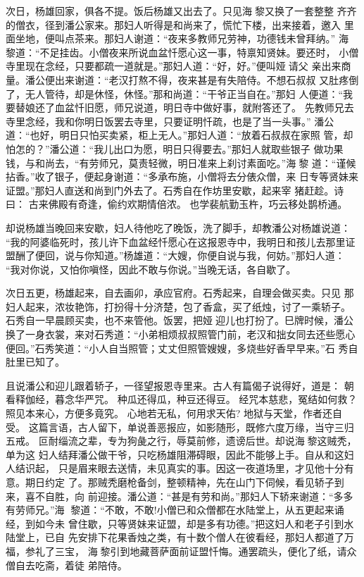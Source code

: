 次日，杨雄回家，俱各不提。饭后杨雄又出去了。只见海黎又换了一套整整
齐齐的僧衣，径到潘公家来。那妇人听得是和尚来了，慌忙下楼，出来接着，邀入
里面坐地，便叫点茶来。那妇人谢道：“夜来多教师兄劳神，功德钱未曾拜纳。”
海黎道：“不足挂齿。小僧夜来所说血盆忏愿心这一事，特禀知贤妹。要还时，
小僧寺里现在念经，只要都疏一道就是。”那妇人道：“好，好。”便叫娅请父
亲出来商量。潘公便出来谢道：“老汉打熬不得，夜来甚是有失陪侍。不想石叔叔
又肚疼倒了，无人管待，却是休怪，休怪。”那和尚道：“干爷正当自在。”那妇
人便道：“我要替娘还了血盆忏旧愿，师兄说道，明日寺中做好事，就附答还了。
先教师兄去寺里念经，我和你明日饭罢去寺里，只要证明忏疏，也是了当一头事。”
潘公道：“也好，明日只怕买卖紧，柜上无人。”那妇人道：“放着石叔叔在家照
管，却怕怎的？”潘公道：“我儿出口为愿，明日只得要去。”那妇人就取些银子
做功果钱，与和尚去，“有劳师兄，莫责轻微，明日准来上刹讨素面吃。”海黎
道：“谨候拈香。”收了银子，便起身谢道：“多承布施，小僧将去分俵众僧，来
日专等贤妹来证盟。”那妇人直送和尚到门外去了。石秀自在作坊里安歇，起来宰
猪赶趁。诗曰：
古来佛殿有奇逢，偷约欢期情倍浓。
也学裴航勤玉杵，巧云移处鹊桥通。

却说杨雄当晚回来安歇，妇人待他吃了晚饭，洗了脚手，却教潘公对杨雄说道：
“我的阿婆临死时，孩儿许下血盆经忏愿心在这报恩寺中，我明日和孩儿去那里证
盟酬了便回，说与你知道。”杨雄道：“大嫂，你便自说与我，何妨。”那妇人道：
“我对你说，又怕你嗔怪，因此不敢与你说。”当晚无话，各自歇了。

次日五更，杨雄起来，自去画卯，承应官府。石秀起来，自理会做买卖。只见
那妇人起来，浓妆艳饰，打扮得十分济楚，包了香盒，买了纸烛，讨了一乘轿子。
石秀自一早晨顾买卖，也不来管他。饭罢，把娅迎儿也打扮了。巳牌时候，潘公
换了一身衣裳，来对石秀道：“小弟相烦叔叔照管门前，老汉和拙女同去还些愿心
便回。”石秀笑道：“小人自当照管；丈丈但照管嫂嫂，多烧些好香早早来。”石
秀自肚里已知了。

且说潘公和迎儿跟着轿子，一径望报恩寺里来。古人有篇偈子说得好，道是：
朝看释伽经，暮念华严咒。
种瓜还得瓜，种豆还得豆。
经咒本慈悲，冤结如何救？
照见本来心，方便多竟究。
心地若无私，何用求天佑?
地狱与天堂，作者还自受。
这篇言语，古人留下，单说善恶报应，如影随形，既修六度万缘，当守三归五戒。
叵耐缁流之辈，专为狗彘之行，辱莫前修，遗谤后世。却说海黎这贼秃，单为这
妇人结拜潘公做干爷，只吃杨雄阻滞碍眼，因此不能够上手。自从和这妇人结识起，
只是眉来眼去送情，未见真实的事。因这一夜道场里，才见他十分有意。期日约定
了。那贼秃磨枪备剑，整顿精神，先在山门下伺候，看见轿子到来，喜不自胜，向
前迎接。潘公道：“甚是有劳和尚。”那妇人下轿来谢道：“多多有劳师兄。”海
黎道：“不敢，不敢!小僧已和众僧都在水陆堂上，从五更起来诵经，到如今未
曾住歇，只等贤妹来证盟，却是多有功德。”把这妇人和老子引到水陆堂上，已自
先安排下花果香烛之类，有十数个僧人在彼看经，那妇人都道了万福，参礼了三宝，
海黎引到地藏菩萨面前证盟忏悔。通罢疏头，便化了纸，请众僧自去吃斋，着徒
弟陪侍。

